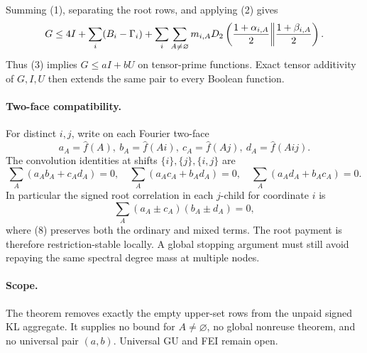 Summing (1), separating the root rows, and applying (2) gives
\[
G\le4I+\sum_i(B_i-\Gamma_i)+
 \sum_i\sum_{A\ne\varnothing}m_{i,A}D_2\left(
 {1+\alpha_{i,A}\over2}\middle\|{1+\beta_{i,A}\over2}\right).
\]
Thus (3) implies $G\le aI+bU$ on tensor-prime functions.  Exact tensor
additivity of $G,I,U$ then extends the same pair to every Boolean function.

\paragraph{Two-face compatibility.}
For distinct $i,j$, write on each Fourier two-face
\[
a_A=\widehat f(A),\ b_A=\widehat f(Ai),\
c_A=\widehat f(Aj),\ d_A=\widehat f(Aij).
\]
The convolution identities at shifts $\{i\},\{j\},\{i,j\}$ are
\[
\sum_A(a_Ab_A+c_Ad_A)=0,
\quad \sum_A(a_Ac_A+b_Ad_A)=0,
\quad \sum_A(a_Ad_A+b_Ac_A)=0.                      \tag{8}
\]
In particular the signed root correlation in each $j$-child for coordinate
$i$ is
\[
\sum_A(a_A\pm c_A)(b_A\pm d_A)=0,                   \tag{9}
\]
where (8) preserves both the ordinary and mixed terms.  The root payment is
therefore restriction-stable locally.  A global stopping argument must still
avoid repaying the same spectral degree mass at multiple nodes.

\paragraph{Scope.}
The theorem removes exactly the empty upper-set rows from the unpaid signed
KL aggregate.  It supplies no bound for $A\ne\varnothing$, no global
nonreuse theorem, and no universal pair $(a,b)$.  Universal GU and FEI
remain open.

